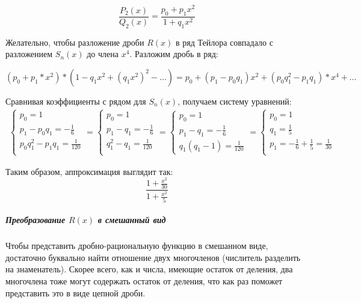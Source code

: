 \documentclass{article}
\begin{document}
    $$\frac{P_2(x)}{Q_2(x)} = \frac{p_0 + p_1x^2}{1 + q_1x^2}$$

    Желательно, чтобы разложение дроби $R(x)$ в ряд Тейлора совпадало 
    с разложением $S_n(x)$ до члена $x^4$. Разложим дробь в ряд:

    $$(p_0 + p_1*x^2) * (1 - q_1x^2 + (q_1x^2)^2 - \dots) = p_0 + (p_1 - p_0q_1)x^2 + (p_0q_1^2 - p_1q_1)*x^4 + \dots$$

    Сравнивая коэффициенты с рядом для $S_n(x)$, 
    получаем систему уравнений:
    \begin{eqnarray*}
        \begin{cases}
            p_0 = 1 \\
            p_1 - p_0q_1 = -\frac{1}{6} \\
            p_0q_1^2 - p_1q_1 = \frac{1}{120} \\ 
        \end{cases} = 
        \begin{cases}
            p_0 = 1 \\
            p_1 - q_1 = -\frac{1}{6} \\
            q_1^2 - q_1 = \frac{1}{120} \\
        \end{cases} =
        \begin{cases}
            p_0 = 1 \\
            p_1 - q_1 = -\frac{1}{6} \\
            q_1(q_1 - 1) = \frac{1}{120}
        \end{cases} = 
        \begin{cases}
            p_0 = 1 \\
            q_1 = \frac{1}{5} \\
            p_1 = -\frac{1}{6} + \frac{1}{5} = \frac{1}{30} \\
        \end{cases}
    \end{eqnarray*}

    Таким образом, аппроксимация выглядит так:
    $$\frac{1 + \frac{x^2}{30}}{1 + \frac{x^2}{5}}$$

    \subparagraph{Преобразование $R(x)$ в смешанный вид}
    
    Чтобы представить дробно-рациональную функцию в смешанном виде,
    достаточно буквально найти отношение двух многочленов (числитель разделить на знаменатель).
    Скорее всего, как и числа, имеющие остаток от деления, два многочлена тоже
    могут содержать остаток от деления, что как раз поможет представить это в виде цепной дроби.
\end{document}
